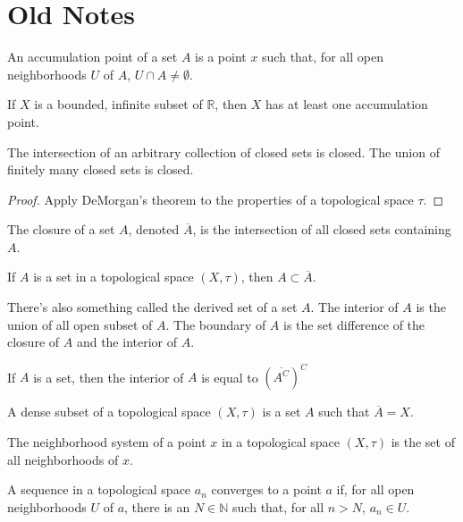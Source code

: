 \section{Old Notes}
    An accumulation point of a set $A$ is a point $x$ such that, for all open
    neighborhoods $U$ of $A$, $U\cap{A}\ne\emptyset$.
    \begin{theorem}
        If $X$ is a bounded, infinite subset of
        $\mathbb{R}$, then $X$ has at least
        one accumulation point.
    \end{theorem}
    \begin{theorem}
        The intersection of an arbitrary collection of
        closed sets is closed. The union of finitely
        many closed sets is closed.
    \end{theorem}
    \begin{proof}
        Apply DeMorgan's theorem to the properties
        of a topological space $\tau$.
    \end{proof}
    \begin{definition}
        The closure of a set $A$, denoted $\overline{A}$, is the intersection of
        all closed sets containing $A$.
    \end{definition}
    \begin{theorem}
        If $A$ is a set in a topological space
        $(X,\tau)$, then $A\subset\overline{A}$.
    \end{theorem}
    There's also something called the derived
    set of a set $A$. The interior of $A$
    is the union of all open subset of $A$.
    The boundary of $A$ is the set difference
    of the closure of $A$ and the interior of
    $A$.
    \begin{theorem}
        If $A$ is a set, then
        the interior of $A$ is equal to
        $(\overline{A^{C}})^{C}$
    \end{theorem}
    \begin{definition}
        A dense subset of a topological
        space $(X,\tau)$ is a set $A$
        such that $\overline{A}=X$.
    \end{definition}
    \begin{definition}
        The neighborhood system of a point
        $x$ in a topological space $(X,\tau)$
        is the set of all neighborhoods of
        $x$.
    \end{definition}
    \begin{definition}
        A sequence in a topological space
        $a_{n}$ converges to a point $a$ if,
        for all open neighborhoods $U$ of $a$,
        there is an $N\in\mathbb{N}$ such that,
        for all $n>N$, $a_{n}\in{U}$.
    \end{definition}
